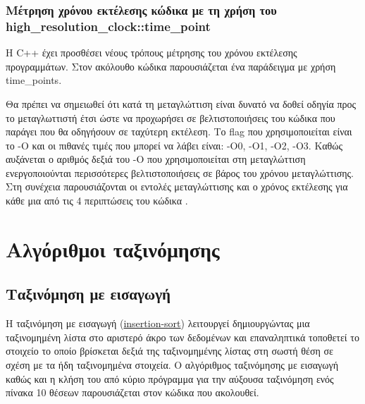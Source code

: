 



\subsubsection{Μέτρηση χρόνου εκτέλεσης κώδικα με τη χρήση του high\_resolution\_clock::time\_point}
Η C++ έχει προσθέσει νέους τρόπους μέτρησης του χρόνου εκτέλεσης προγραμμάτων. Στον ακόλουθο κώδικα παρουσιάζεται ένα παράδειγμα με χρήση time\_points.





Θα πρέπει να σημειωθεί ότι κατά τη μεταγλώττιση είναι δυνατό να δοθεί οδηγία προς το μεταγλωττιστή έτσι ώστε να προχωρήσει σε βελτιστοποιήσεις του κώδικα που παράγει που θα οδηγήσουν σε ταχύτερη εκτέλεση. Το flag που χρησιμοποιείται είναι το -Ο και οι πιθανές τιμές που μπορεί να λάβει είναι: -Ο0, -Ο1, -Ο2, -Ο3. Καθώς αυξάνεται ο αριθμός δεξιά του -Ο που χρησιμοποιείται στη μεταγλώττιση ενεργοποιούνται περισσότερες βελτιστοποιήσεις σε βάρος του χρόνου μεταγλώττισης. Στη συνέχεια παρουσιάζονται οι εντολές μεταγλώττισης και ο χρόνος εκτέλεσης για κάθε μια από τις 4 περιπτώσεις του κώδικα .




\section{Αλγόριθμοι ταξινόμησης}
\subsection{Ταξινόμηση με εισαγωγή}
Η ταξινόμηση με εισαγωγή (\href{http://rosettacode.org/wiki/Sorting_algorithms/Insertion_sort}{insertion-sort}) λειτουργεί δημιουργώντας μια ταξινομημένη λίστα στο αριστερό άκρο των δεδομένων και επαναληπτικά τοποθετεί το στοιχείο το οποίο βρίσκεται δεξιά της ταξινομημένης λίστας στη σωστή θέση σε σχέση με τα ήδη ταξινομημένα στοιχεία. Ο αλγόριθμος ταξινόμησης με εισαγωγή καθώς και η κλήση του από κύριο πρόγραμμα για την αύξουσα ταξινόμηση ενός πίνακα 10 θέσεων παρουσιάζεται στον κώδικα που ακολουθεί.




